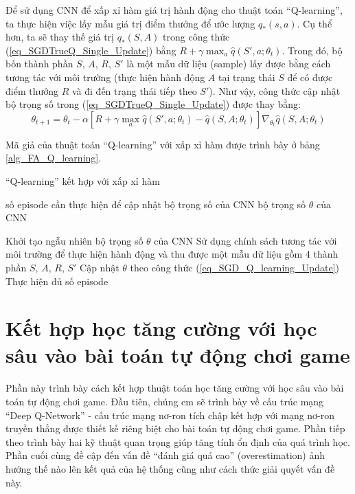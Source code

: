 	Để sử dụng CNN để xấp xỉ hàm giá trị hành động cho thuật toán ``Q-learning'', ta thực hiện việc lấy mẫu giá trị điểm thưởng để ước lượng $q_{*}(s,a)$.
	Cụ thể hơn, ta sẽ thay thế giá trị $q_{*}(S,A)$ trong công thức (\ref{eq_SGDTrueQ_Single_Update}) bằng $R + \gamma \max_{a}\hat{q}(S', a;\theta_t)$.
	Trong đó, bộ bốn thành phần $S$, $A$, $R$, $S'$ là một mẫu dữ liệu (sample) lấy được bằng cách tương tác với môi trường (thực hiện hành động $A$ tại trạng thái $S$ để có được điểm thưởng $R$ và đi đến trạng thái tiếp theo $S'$).
	Như vậy, công thức cập nhật bộ trọng số trong (\ref{eq_SGDTrueQ_Single_Update}) được thay bằng:
	\begin{equation}
		\label{eq_SGD_Q_learning_Update}
		\theta_{t+1} = \theta_t - \alpha \left[ R + \gamma \max_{a}\hat{q}(S', a;\theta_t) - \hat{q}(S,A;\theta_t) \right] \nabla_{\theta_t} \hat{q}(S, A;\theta_t)	
	\end{equation}
	
	Mã giả của thuật toán ``Q-learning'' với xấp xỉ hàm được trình bày ở bảng \ref{alg_FA_Q_learning}.
	\begin{algorithm}
		\caption{``Q-learning'' kết hợp với xấp xỉ hàm}
		\label{alg_FA_Q_learning}
		\begin{algorithmic}[1]
			\renewcommand{\algorithmicrequire}{\textbf{Đầu vào:}}
			\renewcommand{\algorithmicensure}{\textbf{Đầu ra:}}
			\algnewcommand{}
			\algnewcommand\Operation{\item[\algorithmicoperation]}
			
			\Require số episode cần thực hiện để cập nhật bộ trọng số của CNN
			\Ensure bộ trọng số $\theta$ của CNN
			
			\Operation
			\State Khởi tạo ngẫu nhiên bộ trọng số $\theta$ của CNN
			\Repeat
				\State Sử dụng chính sách tương tác với môi trường để thực hiện hành động và thu được một mẫu dữ liệu gồm 4 thành phần $S$, $A$, $R$, $S'$
				\State Cập nhật $\theta$ theo công thức (\ref{eq_SGD_Q_learning_Update})
			\Until Thực hiện đủ số episode
		\end{algorithmic}
	\end{algorithm}
	
\section{Kết hợp học tăng cường với học sâu vào bài toán tự động chơi game}
	Phần này trình bày cách kết hợp thuật toán học tăng cường với học sâu vào bài toán tự động chơi game.
	Đầu tiên, chúng em sẽ trình bày về cấu trúc mạng ``Deep Q-Network'' \cite{mnihdqn2015} - cấu trúc mạng nơ-ron tích chập kết hợp với mạng nơ-ron truyền thẳng được thiết kế riêng biệt cho bài toán tự động chơi game.
	Phần tiếp theo trình bày hai kỹ thuật quan trọng giúp tăng tính ổn định của quá trình học.
	Phần cuối cùng đề cập đến vấn đề ``đánh giá quá cao'' (overestimation) ảnh hưởng thế nào lên kết quả của hệ thống cũng như cách thức giải quyết vấn đề này.
	

